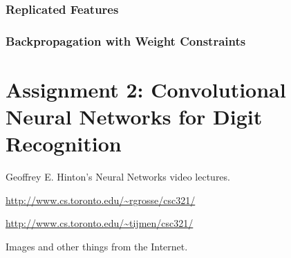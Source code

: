 \documentclass[12pt]{article}
\theoremstyle{plain}
\theoremstyle{definition}
\theoremstyle{remark}
\begin{document}
\section{Replicated Features}

\section{Backpropagation with Weight Constraints}

\part{Assignment 2: Convolutional Neural Networks for Digit Recognition}

\begin{thebibliography}{99}

Geoffrey E. Hinton's Neural Networks video lectures.

\url{http://www.cs.toronto.edu/~rgrosse/csc321/}

\url{http://www.cs.toronto.edu/~tijmen/csc321/}

Images and other things from the Internet.

\end{thebibliography}
\end{document}
